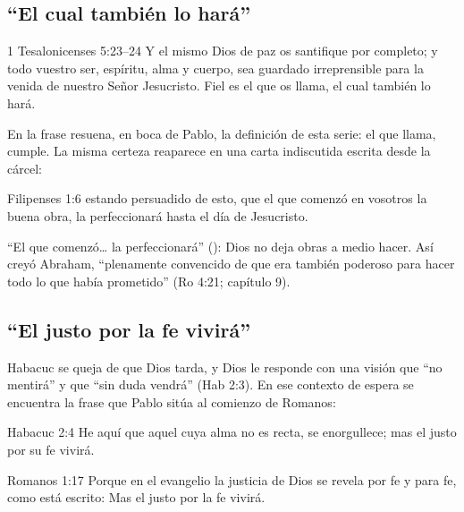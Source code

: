 \subsection{“El cual también lo hará”}
\begin{verso}{1 Tesalonicenses 5:23–24}
Y el mismo Dios de paz os santifique por completo; y todo vuestro ser, espíritu, alma y cuerpo, sea guardado irreprensible para la venida de nuestro Señor Jesucristo. Fiel es el que os llama, el cual también lo hará.
\end{verso}

En la frase  resuena, en boca de Pablo, la definición de esta serie: el que llama, cumple. La misma certeza reaparece en una carta indiscutida escrita desde la cárcel:

\begin{verso}{Filipenses 1:6}
estando persuadido de esto, que el que comenzó en vosotros la buena obra, la perfeccionará hasta el día de Jesucristo.
\end{verso}

``El que comenzó\ldots{} la perfeccionará'' (): Dios no deja obras a medio hacer. Así creyó Abraham, ``plenamente convencido de que era también poderoso para hacer todo lo que había prometido'' (Ro 4:21; capítulo 9).

\subsection{“El justo por la fe vivirá”}
Habacuc se queja de que Dios tarda, y Dios le responde con una visión que ``no mentirá'' y que ``sin duda vendrá'' (Hab 2:3). En ese contexto de espera se encuentra la frase que Pablo sitúa al comienzo de Romanos:

\begin{verso}{Habacuc 2:4}
He aquí que aquel cuya alma no es recta, se enorgullece; mas el justo por su fe vivirá.
\end{verso}
\begin{verso}{Romanos 1:17}
Porque en el evangelio la justicia de Dios se revela por fe y para fe, como está escrito: Mas el justo por la fe vivirá.
\end{verso}

